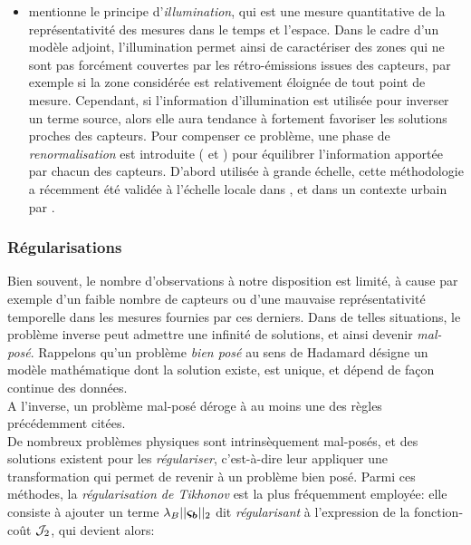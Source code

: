 \begin{itemize}
	 \item \cite{Issartel2005} mentionne le principe d'\textit{illumination}, qui est une mesure quantitative de la représentativité des mesures dans le temps et l'espace. Dans le cadre d'un modèle adjoint, l'illumination permet ainsi de caractériser des zones qui ne sont pas forcément couvertes par les rétro-émissions issues des capteurs, par exemple si la zone considérée est relativement éloignée {de tout point de mesure}. Cependant, si l'information d'illumination est utilisée pour inverser un terme source, alors elle aura tendance à fortement favoriser les solutions proches des capteurs. Pour compenser ce problème, une phase de \textit{renormalisation} est introduite (\cite{Issartel2007} et \cite{Sharan2009}) pour équilibrer l'information apportée par chacun des capteurs. D'abord utilisée à grande échelle, cette méthodologie a récemment été validée à l'échelle locale dans \cite{Singh2014}, et dans un contexte urbain par \cite{Kumar2015}. \\

\end{itemize}

\subsubsection{Régularisations}

Bien souvent, le nombre d'observations à notre disposition est limité, à cause par exemple d'un faible nombre de capteurs ou d'une mauvaise représentativité temporelle dans les mesures fournies par ces derniers. Dans de telles situations, le problème inverse peut admettre une infinité de solutions, et ainsi devenir \textit{mal-posé}. Rappelons qu'un problème \textit{bien posé} au sens de Hadamard \cite{Hadamard1902} désigne un modèle mathématique dont la solution existe, est unique, et dépend de façon continue des données. \\

A l'inverse, un problème mal-posé déroge à au moins une des règles précédemment citées. \\

De nombreux problèmes physiques sont intrinsèquement mal-posés, et des solutions existent pour les \textit{régulariser}, c'est-à-dire leur appliquer une transformation qui permet de revenir à un problème bien posé. Parmi ces méthodes, la \textit{régularisation de Tikhonov} \cite{Tikhonov1963} est la plus fréquemment employée: elle consiste à ajouter un terme $\lambda_B ||{\bm{\varsigma_b}}||_2$ dit \textit{régularisant} à l'expression de la fonction-coût ${\mathcal{J}}_2$, qui devient alors:

